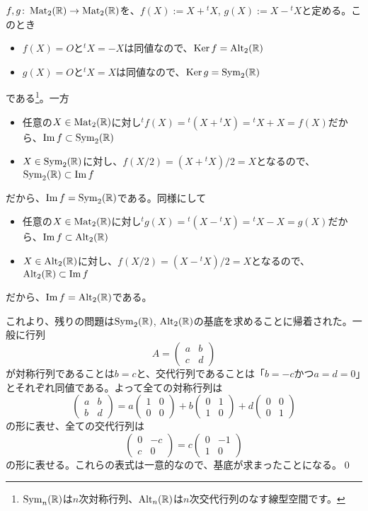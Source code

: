 $f, g\colon \operatorname{Mat}_2(\mathbb{R}) \rightarrow \operatorname{Mat}_2(\mathbb{R})$を、$f(X) := X + {}^t X$, $g(X) := X - {}^t X$と定める。このとき
\begin{itemize}
\item $f(X) = O$と${}^t X = -X$は同値なので、$\operatorname{Ker} f = \operatorname{Alt}_2(\mathbb{R})$
\item $g(X) = O$と${}^t X = X$は同値なので、$\operatorname{Ker} g = \operatorname{Sym}_2(\mathbb{R})$
\end{itemize}
である\footnote{$\operatorname{Sym}_n(\mathbb{R})$は$n$次対称行列、$\operatorname{Alt}_n(\mathbb{R})$は$n$次交代行列のなす線型空間です。}。一方
\begin{itemize}
\item 任意の$X \in \operatorname{Mat}_2(\mathbb{R})$に対し${}^t f(X) = {}^t(X + {}^t X) = {}^t X + X = f(X)$だから、$\mathrm{Im}\, f \subset \operatorname{Sym}_2(\mathbb{R})$
\item $X \in \operatorname{Sym}_2(\mathbb{R})$に対し、$f(X/2) = (X + {}^t X)/2 = X$となるので、$\operatorname{Sym}_2(\mathbb{R}) \subset \mathrm{Im}\, f$
\end{itemize}
だから、$\mathrm{Im}\, f = \operatorname{Sym}_2(\mathbb{R})$である。同様にして
\begin{itemize}
\item 任意の$X \in \operatorname{Mat}_2(\mathbb{R})$に対し${}^t g(X) = {}^t(X - {}^t X) = {}^t X - X = g(X)$だから、$\mathrm{Im}\, f \subset \operatorname{Alt}_2(\mathbb{R})$
\item $X \in \operatorname{Alt}_2(\mathbb{R})$に対し、$f(X/2) = (X - {}^t X)/2 = X$となるので、$\operatorname{Alt}_2(\mathbb{R}) \subset \mathrm{Im}\, f$
\end{itemize}
だから、$\mathrm{Im}\, f = \operatorname{Alt}_2(\mathbb{R})$である。

これより、残りの問題は$\operatorname{Sym}_2(\mathbb{R})$, $\operatorname{Alt}_2(\mathbb{R})$の基底を求めることに帰着された。一般に行列
\[
A =
\begin{pmatrix}
a & b \\
c & d
\end{pmatrix}
\]
が対称行列であることは$b = c$と、交代行列であることは「$b = -c$かつ$a = d = 0$」とそれぞれ同値である。よって全ての対称行列は
\[
\begin{pmatrix}
a & b \\
b & d
\end{pmatrix}
=
a
\begin{pmatrix}
1 & 0 \\
0 & 0
\end{pmatrix}
+ b
\begin{pmatrix}
0 & 1 \\
1 & 0
\end{pmatrix}
+ d
\begin{pmatrix}
0 & 0 \\
0 & 1
\end{pmatrix}
\]
の形に表せ、全ての交代行列は
\[
\begin{pmatrix}
0 & -c \\
c & 0
\end{pmatrix}
= c
\begin{pmatrix}
0 & -1 \\
1 & 0
\end{pmatrix}
\]
の形に表せる。これらの表式は一意的なので、基底が求まったことになる。\qed

